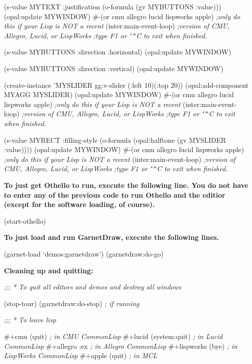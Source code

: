 \begin{programexample}
(s-value MYTEXT :justification (o-formula (gv MYBUTTONS :value)))
(opal:update MYWINDOW)
\#-(or cmu allegro lucid lispworks apple)  {\it ;only do this if your Lisp is NOT a recent}
(inter:main-event-loop)                   {\it ;version of CMU, Allegro, Lucid, or LispWorks}
                                          {\it ;type F1 or {\tt\char`\^}C to exit when finished.}

(s-value MYBUTTONS :direction :horizontal)
(opal:update MYWINDOW)

(s-value MYBUTTONS :direction :vertical)
(opal:update MYWINDOW)

(create-instance 'MYSLIDER gg:v-slider
  (:left 10)(:top 20))
(opal:add-component MYAGG MYSLIDER)
(opal:update MYWINDOW)
\#-(or cmu allegro lucid lispworks apple)  {\it ;only do this if your Lisp is NOT a recent}
(inter:main-event-loop)                   {\it ;version of CMU, Allegro, Lucid, or LispWorks}
                                          {\it ;type F1 or {\tt\char`\^}C to exit when finished.}

(s-value MYRECT :filling-style (o-formula
				(opal:halftone (gv MYSLIDER :value))))
(opal:update MYWINDOW)
\#-(or cmu allegro lucid lispworks apple)  {\it ;only do this if your Lisp is NOT a recent}
(inter:main-event-loop)                   {\it ;version of CMU, Allegro, Lucid, or LispWorks}
                                          {\it ;type F1 or {\tt\char`\^}C to exit when finished.}
\end{programexample}

{\bf To just get Othello to run, execute the following line.
You do not have to enter any of the previous code to run Othello and
the editior (except for the software loading, of course).}
\begin{programexample}

(start-othello)

\end{programexample}


{\bf To just load and run GarnetDraw, execute the following lines.}

\begin{programexample}

(garnet-load `demos:garnetdraw')
(garnetdraw:do-go)

\end{programexample}

{\bf Cleaning up and quitting:}
\begin{programexample}
{\it ;;; * To quit all editors and demos and destroy all windows}

(stop-tour)
(garnetdraw:do-stop)   {\it ; if running}

{\it ;;; * To leave lisp}

\#+cmu   (quit)         {\it ; in CMU CommonLisp}
\#+lucid (system:quit)  {\it ; in Lucid CommonLisp}
\#+allegro :ex          {\it ; in Allegro CommonLisp}
\#+lispworks (bye)      {\it ; in LispWorks CommonLisp}
\#+apple (quit)         {\it ; in MCL}

\end{programexample}


